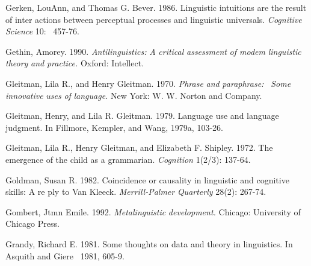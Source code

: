 \begin{styleStandard}
Gerken, LouAnn, and Thomas G. Bever. 1986. Linguistic intuitions are the result of inter\- actions between perceptual processes and linguistic universals. \textit{Cognitive}\textit{ }\textit{Science}\textit{ }10: \ 457-76.
\end{styleStandard}


\begin{styleStandard}
Gethin, Amorey. 1990. \textit{Antilinguistics:}\textit{ }\textit{A}\textit{ }\textit{critical}\textit{ }\textit{assessment}\textit{ }\textit{of modem}\textit{ }\textit{linguistic}\textit{ }\textit{theory}\textit{ }\textit{and}\textit{ }\textit{practice.}\textit{ }Oxford: Intellect.
\end{styleStandard}


\begin{styleStandard}
Gleitman, Lila R., and Henry Gleitman. 1970. \textit{Phrase}\textit{ }\textit{and}\textit{ }\textit{paraphrase: }\textit{\ }\textit{Some}\textit{ }\textit{innovative}\textit{ }\textit{uses}\textit{ }\textit{of}\textit{ }\textit{language.}\textit{ }New York: W. W. Norton and Company.
\end{styleStandard}


\begin{styleStandard}
Gleitman, Henry, and Lila R. Gleitman. 1979. Language use and language judgment. In Fillmore, Kempler, and Wang, 1979a, 103-26.
\end{styleStandard}


\begin{styleStandard}
Gleitman, Lila R., Henry Gleitman, and Elizabeth F. Shipley. 1972. The emergence of the child as a grammarian. \textit{Cognition}\textit{ }1(2/3): 137-64.\ \ {\textquotesingle}
\end{styleStandard}


\begin{styleStandard}
Goldman, Susan R. 1982. Coincidence or causality in linguistic and cognitive skills: A re\- ply to Van Kleeck. \textit{Merrill-Palmer}\textit{ }\textit{Quarterly}\textit{ }28(2): 267-74.
\end{styleStandard}


\begin{styleStandard}
Gombert, Jtmn Emile. 1992. \textit{Metalinguistic}\textit{ }\textit{development.}\textit{ }Chicago: University of Chicago Press.
\end{styleStandard}


\begin{styleStandard}
Grandy, Richard E. 1981. Some thoughts on data and theory in linguistics. In Asquith and Giere \ 1981, 605-9.
\end{styleStandard}


